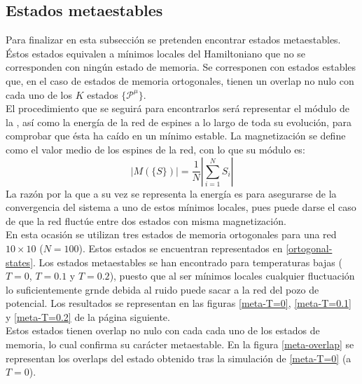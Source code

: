 \documentclass[titlepage,12pt]{article}
\numberwithin{equation}{section}
\begin{document}
	\subsection{Estados metaestables}
	Para finalizar en esta subsección se pretenden encontrar estados metaestables. Éstos estados equivalen a mínimos locales del Hamiltoniano que no se corresponden con ningún estado de memoria. Se corresponen con estados estables que, en el caso de estados de memoria ortogonales, tienen un overlap no nulo con cada uno de los $K$ estados $\{\mathcal{P}^{\mu}\}$.
	\\
	El procedimiento que se seguirá para encontrarlos será representar el módulo de la , así como la energía de la red de espines a lo largo de toda su evolución, para comprobar que ésta ha caído en un mínimo estable. La magnetización se define como el valor medio de los espines de la red, con lo que su módulo es:
	\begin{equation}
	    \left|M(\{S\})\right| = \frac{1}{N} \left| \sum_{i=1}^{N} S_{i} \right|
	\end{equation}
	La razón por la que a su vez se representa la energía es para asegurarse de la convergencia del sistema a uno de estos mínimos locales, pues puede darse el caso de que la red fluctúe entre dos estados con misma magnetización.
	\\
	En esta ocasión se utilizan tres estados de memoria ortogonales para una red $10 \times 10$ ($N = 100$). Estos estados se encuentran representados en \ref{ortogonal-states}. Los estados metaestables se han encontrado para temperaturas bajas ($T = 0$, $T = 0.1$ y $T = 0.2$), puesto que al ser mínimos locales cualquier fluctuación lo suficientemente grnde debida al ruido puede sacar a la red del pozo de potencial. Los resultados se representan en las figuras \ref{meta-T=0}, \ref{meta-T=0.1} y \ref{meta-T=0.2} de la página siguiente.
	\\
	Estos estados tienen overlap no nulo con cada cada uno de los estados de memoria, lo cual confirma su carácter metaestable. En la figura \ref{meta-overlap} se representan los overlaps del estado obtenido tras la simulación de \ref{meta-T=0} (a $T = 0$).
\end{document}
